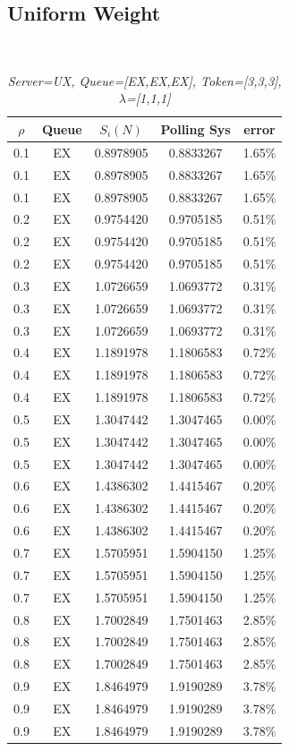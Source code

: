 \documentclass[12pt,a4paper,italian]{article}
\begin{document}
\subsection{Uniform Weight}
\ \ \
\begin{table}[ht!]
	\begin{minipage}[b]{0.48\linewidth}\centering
		\centering
		\caption{\scriptsize \emph{Server=UX, Queue=[EX,EX,EX], Token=[3,3,3], $\lambda$=[1,1,1] }}
		\label{tab17}
		\tiny
		\begin{tabular}{c c c c c}
			\hline
			$\rho$ & Queue & $S_i(N)$ & Polling Sys & error \\ \hline
			 0.1 & EX & 0.8978905 &   0.8833267    & 1.65\% \\
			 0.1 & EX & 0.8978905 &   0.8833267    & 1.65\% \\
			 0.1 & EX & 0.8978905 &   0.8833267    & 1.65\% \\ \hline \hline
			 0.2 & EX & 0.9754420 &   0.9705185    & 0.51\% \\
			 0.2 & EX & 0.9754420 &   0.9705185    & 0.51\% \\
			 0.2 & EX & 0.9754420 &   0.9705185    & 0.51\% \\ \hline \hline
			 0.3 & EX & 1.0726659 &   1.0693772    & 0.31\% \\
			 0.3 & EX & 1.0726659 &   1.0693772    & 0.31\% \\
			 0.3 & EX & 1.0726659 &   1.0693772    & 0.31\% \\ \hline \hline
			 0.4 & EX & 1.1891978 &   1.1806583    & 0.72\% \\
			 0.4 & EX & 1.1891978 &   1.1806583    & 0.72\% \\
			 0.4 & EX & 1.1891978 &   1.1806583    & 0.72\% \\ \hline \hline
			 0.5 & EX & 1.3047442 &   1.3047465    & 0.00\% \\
			 0.5 & EX & 1.3047442 &   1.3047465    & 0.00\% \\
			 0.5 & EX & 1.3047442 &   1.3047465    & 0.00\% \\ \hline \hline
			 0.6 & EX & 1.4386302 &   1.4415467    & 0.20\% \\
			 0.6 & EX & 1.4386302 &   1.4415467    & 0.20\% \\
			 0.6 & EX & 1.4386302 &   1.4415467    & 0.20\% \\ \hline \hline
			 0.7 & EX & 1.5705951 &   1.5904150    & 1.25\% \\
			 0.7 & EX & 1.5705951 &   1.5904150    & 1.25\% \\
			 0.7 & EX & 1.5705951 &   1.5904150    & 1.25\% \\ \hline \hline
			 0.8 & EX & 1.7002849 &   1.7501463    & 2.85\% \\
			 0.8 & EX & 1.7002849 &   1.7501463    & 2.85\% \\
			 0.8 & EX & 1.7002849 &   1.7501463    & 2.85\% \\ \hline \hline
			 0.9 & EX & 1.8464979 &   1.9190289    & 3.78\% \\
			 0.9 & EX & 1.8464979 &   1.9190289    & 3.78\% \\
			 0.9 & EX & 1.8464979 &   1.9190289    & 3.78\% \\\hline
			

\end{tabular}
\end{minipage}
\end{table}
\end{document}
